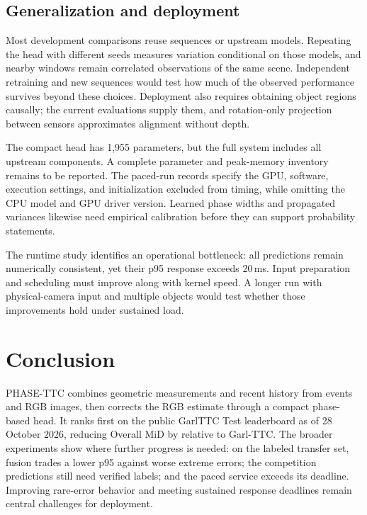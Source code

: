\subsection{Generalization and deployment}
Most development comparisons reuse sequences or upstream models. Repeating the head with different seeds measures variation conditional on those models, and nearby windows remain correlated observations of the same scene. Independent retraining and new sequences would test how much of the observed performance survives beyond these choices. Deployment also requires obtaining object regions causally; the current evaluations supply them, and rotation-only projection between sensors approximates alignment without depth.

The compact head has 1,955 parameters, but the full system includes all upstream components. A complete parameter and peak-memory inventory remains to be reported. The paced-run records specify the GPU, software, execution settings, and initialization excluded from timing, while omitting the CPU model and GPU driver version. Learned phase widths and propagated variances likewise need empirical calibration before they can support probability statements.

The runtime study identifies an operational bottleneck: all predictions remain numerically consistent, yet their p95 response exceeds 20\,ms. Input preparation and scheduling must improve along with kernel speed. A longer run with physical-camera input and multiple objects would test whether those improvements hold under sustained load. 

\section{Conclusion}
PHASE-TTC combines geometric measurements and recent history from events and RGB images, then corrects the RGB estimate through a compact phase-based head. It ranks first on the public GarlTTC Test leaderboard as of 28 October 2026, reducing Overall MiD by \OfficialOverallRelativeGain{} relative to Garl-TTC. The broader experiments show where further progress is needed: on the labeled transfer set, fusion trades a lower p95 against worse extreme errors; the competition predictions still need verified labels; and the paced service exceeds its deadline. Improving rare-error behavior and meeting sustained response deadlines remain central challenges for deployment.
\FloatBarrier
